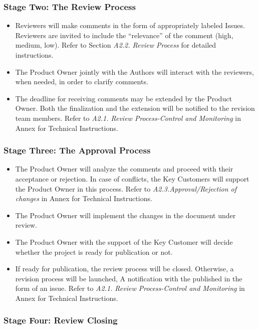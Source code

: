 \documentclass{template/openetcs_article}
\begin{document}
\subsubsection{Stage Two: The Review Process}

\begin{itemize}
\item Reviewers will make comments in the form of appropriately labeled Issues. Reviewers are invited to include the “relevance” of the comment (high, medium, low). Refer to Section {\it A2.2. Review Process} for detailed instructions.
\item The Product Owner jointly with the Authors will interact with the reviewers, when needed, in order to clarify comments.  
\item The deadline for receiving comments may be extended by the Product Owner. Both the finalization and the extension will be notified to the revision team members. Refer to {\it A2.1. Review Process-Control and Monitoring} in Annex for Technical Instructions.
\end{itemize}

\subsubsection{Stage Three: The Approval Process}

\begin{itemize}
\item The Product Owner will analyze the comments and proceed with their acceptance or rejection. In case of conflicts, the Key Customers will support the Product Owner in this process. Refer to {\it A2.3.Approval/Rejection of changes} in Annex for Technical Instructions.
\item The Product Owner will implement the changes in the document under review.  
\item The Product Owner with the support of the Key Customer will decide whether the project is ready for publication or not.
\item If ready for publication, the review process will be closed. Otherwise, a revision process will be launched, A notification with the published in the form of an issue. Refer to {\it A2.1. Review Process-Control and Monitoring} in Annex for Technical Instructions.
\end{itemize}

\subsubsection{Stage Four: Review Closing}
\end{document}
